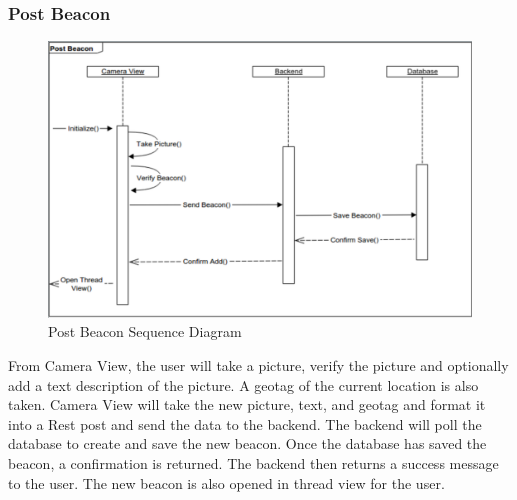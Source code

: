        \subsubsection{Post Beacon}
            \begin{figure}[H]
                \centering
                \includegraphics[width=\textwidth]{src/img/post-beacon.png}
                \caption{Post Beacon Sequence Diagram} 
            \end{figure}

            From Camera View, the user will take a picture, verify the picture
            and optionally add a text description of the picture. A geotag of
            the current location is also taken. Camera View will take the new
            picture, text, and geotag and format it into a Rest post and send
            the data to the backend. The backend will poll the database to
            create and save the new beacon. Once the database has saved the
            beacon, a confirmation is returned. The backend then returns a
            success message to the user. The new beacon is also opened in thread
            view for the user. 

